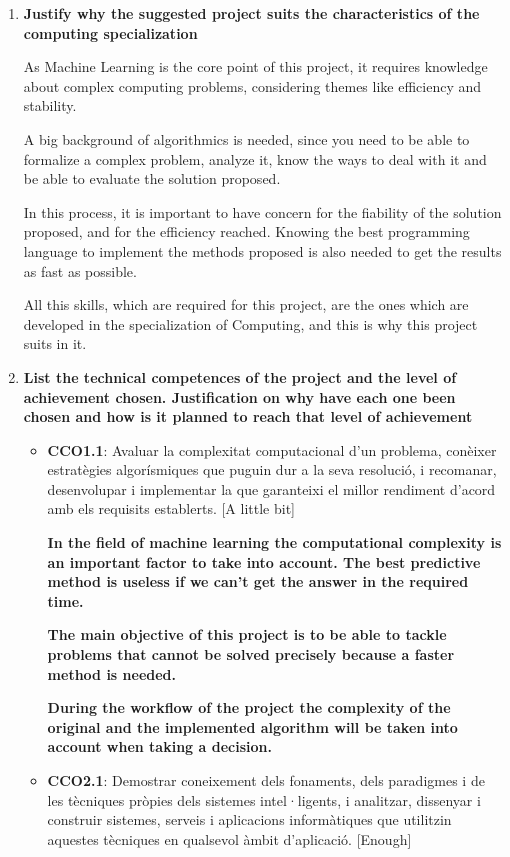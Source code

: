 \documentclass[a4paper]{article}
\begin{document}
\begin{enumerate}
        \item \textbf{Justify why the suggested project suits the characteristics of the computing specialization}

        As Machine Learning is the core point of this project, it requires knowledge about complex computing problems, considering themes like efficiency and stability.

        A big background of algorithmics is needed, since you need to be able to formalize a complex problem, analyze it, know the ways to deal with it and be able to evaluate the solution proposed.

        In this process, it is important to have concern for the fiability of the solution proposed, and for the efficiency reached. Knowing the best programming language to implement the methods proposed is also needed to get the results as fast as possible.

        All this skills, which are required for this project, are the ones which are developed in the specialization of Computing, and this is why this project suits in it.

        \item \textbf{List the technical competences of the project and the level of achievement chosen. Justification on why have each one been chosen and how is it planned to reach that level of achievement}

        \begin{itemize}
            \item \textbf{CCO1.1}: Avaluar la complexitat computacional d'un problema, conèixer estratègies algorísmiques que puguin dur a la seva resolució, i recomanar, desenvolupar i implementar la que garanteixi el millor rendiment d'acord amb els requisits establerts. [A little bit]

            \textbf{In the field of machine learning the computational complexity is an important factor to take into account. The best predictive method is useless if we can't get the answer in the required time.}

            \textbf{The main objective of this project is to be able to tackle problems that cannot be solved precisely because a faster method is needed.}

            \textbf{During the workflow of the project the complexity of the original and the implemented algorithm will be taken into account when taking a decision.}

            \item \textbf{CCO2.1}: Demostrar coneixement dels fonaments, dels paradigmes i de les tècniques pròpies dels sistemes intel·ligents, i analitzar, dissenyar i construir sistemes, serveis i aplicacions informàtiques que utilitzin aquestes tècniques en qualsevol àmbit d'aplicació. [Enough]


\end{itemize}
\end{enumerate}
\end{document}
